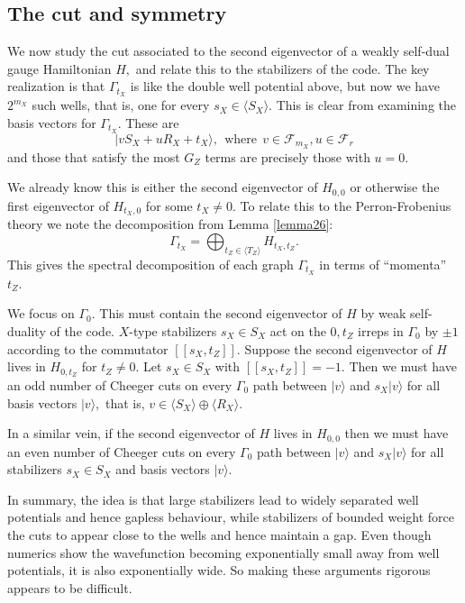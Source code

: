 \documentclass[11pt,oneside]{article}
\newcommand{\ket}[1]{|{#1}\rangle}
\def\Span#1{\langle #1 \rangle}
\def\smbox#1{\ \ \mbox{#1}\ \ }
\newcommand{\Field}{\mathcal{F}}
\def\Frd{\Field_{r}}
\begin{document}
\subsection{The cut and symmetry}

We now study 
the cut associated to the second eigenvector of a 
weakly self-dual gauge Hamiltonian $H,$
and relate this to the stabilizers of the code.
The key realization is that $\Gamma_{t_X}$ is like
the double well potential above,
but now we have $2^{m_X}$ such wells,
that is, one for every $s_X\in \Span{S_X}.$
This is clear from examining the basis vectors for $\Gamma_{t_X}.$
These are 
$$
    \ket{v S_X + u R_X + t_X}, \smbox{where} v\in \Field_{m_X}, u\in\Frd
$$
and those that satisfy the most $G_Z$ terms are
precisely those with $u=0.$

We already know this is either the second eigenvector of $H_{0,0}$
or otherwise the first eigenvector of $H_{t_X,0}$ for some $t_X \ne 0.$
To relate this to the Perron-Frobenius theory we note the 
decomposition from Lemma \ref{lemma26}:
$$
    \Gamma_{t_X} = \bigoplus_{t_Z\in\Span{T_Z}} H_{t_X, t_Z}.
$$
This gives the spectral decomposition of each graph $\Gamma_{t_X}$ 
in terms of ``momenta'' $t_Z.$

We focus on $\Gamma_0.$
This must contain the second eigenvector of $H$ by weak self-duality of the code.
$X$-type stabilizers $s_X\in S_X$ act on the $0,t_Z$ irreps in $\Gamma_0$
by $\pm 1$ according to the commutator $[[s_X, t_Z]].$
Suppose the second eigenvector of $H$ lives in
$H_{0,t_Z}$ for $t_Z\ne 0$. 
Let $s_X\in S_X$ with $[[s_X, t_Z]]=-1.$
Then we must have an odd number of Cheeger cuts 
on every $\Gamma_0$ path between $\ket{v}$ and $s_X\ket{v}$ for all basis
vectors $\ket{v},$ that is, $v\in\Span{S_X}\oplus\Span{R_X}.$

In a similar vein, if the second eigenvector of $H$ lives in $H_{0,0}$
then we must have an even number of Cheeger cuts 
on every $\Gamma_0$ path between $\ket{v}$ and $s_X\ket{v}$ for all stabilizers $s_X\in S_X$
and basis vectors $\ket{v}.$

In summary, the idea is that large stabilizers lead to
widely separated well potentials and hence gapless behaviour,
while stabilizers of bounded weight force the cuts to
appear close to the wells and hence maintain a gap.
Even though numerics show the wavefunction becoming 
exponentially small away from well potentials,
it is also exponentially wide.
So making these arguments rigorous appears to be difficult.
\end{document}
